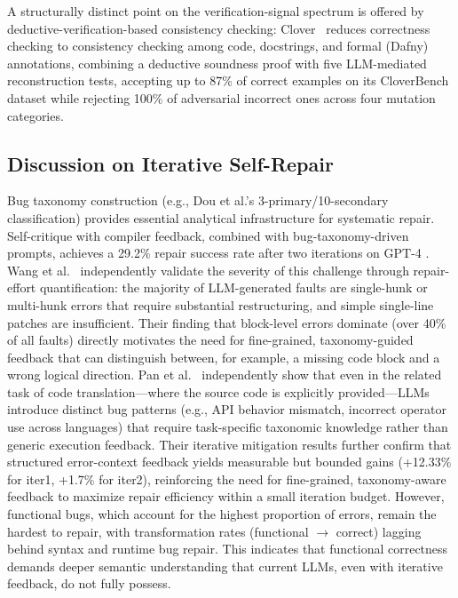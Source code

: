 \documentclass[10pt,a4paper]{article}
\begin{document}
A structurally distinct point on the verification-signal spectrum is offered by deductive-verification-based consistency checking: Clover~\cite{sun2024clover} reduces correctness checking to consistency checking among code, docstrings, and formal (Dafny) annotations, combining a deductive soundness proof with five LLM-mediated reconstruction tests, accepting up to 87\% of correct examples on its CloverBench dataset while rejecting 100\% of adversarial incorrect ones across four mutation categories.

\subsection{Discussion on Iterative Self-Repair}
Bug taxonomy construction (e.g., Dou et al.'s 3-primary/10-secondary classification) provides essential analytical infrastructure for systematic repair. Self-critique with compiler feedback, combined with bug-taxonomy-driven prompts, achieves a 29.2\% repair success rate after two iterations on GPT-4 \cite{dou2026}. Wang et al.~\cite{wang2025where} independently validate the severity of this challenge through repair-effort quantification: the majority of LLM-generated faults are single-hunk or multi-hunk errors that require substantial restructuring, and simple single-line patches are insufficient. Their finding that block-level errors dominate (over 40\% of all faults) directly motivates the need for fine-grained, taxonomy-guided feedback that can distinguish between, for example, a missing code block and a wrong logical direction. Pan et al.~\cite{pan2024lost} independently show that even in the related task of code translation---where the source code is explicitly provided---LLMs introduce distinct bug patterns (e.g., API behavior mismatch, incorrect operator use across languages) that require task-specific taxonomic knowledge rather than generic execution feedback. Their iterative mitigation results further confirm that structured error-context feedback yields measurable but bounded gains (+12.33\% for iter1, +1.7\% for iter2), reinforcing the need for fine-grained, taxonomy-aware feedback to maximize repair efficiency within a small iteration budget. However, functional bugs, which account for the highest proportion of errors, remain the hardest to repair, with transformation rates (functional $\to$ correct) lagging behind syntax and runtime bug repair. This indicates that functional correctness demands deeper semantic understanding that current LLMs, even with iterative feedback, do not fully possess.
\end{document}
